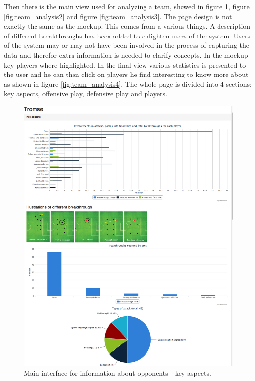 Then there is the main view used for analyzing a team, showed in figure \ref{fig:team_analysis1}, figure \ref{fig:team_analysis2} and figure \ref{fig:team_analysis3}. The page design is not exactly the same as the mockup. This comes from a various things. A description of different breakthroughs has been added to enlighten users of the system. Users of the system may or may not have been involved in the process of capturing the data and therefor-extra information is needed to clarify concepts. In the mockup key players where highlighted. In the final view various statistics is presented to the user and he can then click on players he find interesting to know more about as shown in figure \ref{fig:team_analysis4}. The whole page is divided into 4 sections; key aspects, offensive play, defensive play and players.

\begin{figure}[ht!]
\centering
\includegraphics[width=1\textwidth]{images/general/team_analysis1.png}
\caption{Main interface for information about opponents - key aspects.}
\label{fig:team_analysis1}
\end{figure}

